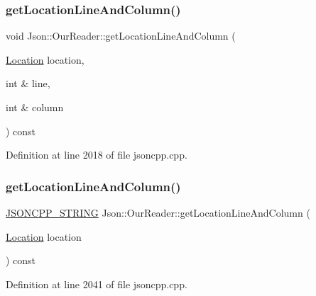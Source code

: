 \subsubsection{\texorpdfstring{get\+Location\+Line\+And\+Column()}{getLocationLineAndColumn()}\hspace{0.1cm}{\footnotesize\ttfamily [1/2]}}
{\footnotesize\ttfamily void Json\+::\+Our\+Reader\+::get\+Location\+Line\+And\+Column (\begin{DoxyParamCaption}\item[{\hyperlink{class_json_1_1_our_reader_a1bdc7bbc52ba87cae6b19746f2ee0189}{Location}}]{location,  }\item[{int \&}]{line,  }\item[{int \&}]{column }\end{DoxyParamCaption}) const\hspace{0.3cm}{\ttfamily [private]}}



Definition at line 2018 of file jsoncpp.\+cpp.

\hypertarget{class_json_1_1_our_reader_ac129e94cdc260822b2fd24e2ca35e636}{}\label{class_json_1_1_our_reader_ac129e94cdc260822b2fd24e2ca35e636} 
\subsubsection{\texorpdfstring{get\+Location\+Line\+And\+Column()}{getLocationLineAndColumn()}\hspace{0.1cm}{\footnotesize\ttfamily [2/2]}}
{\footnotesize\ttfamily \hyperlink{config_8h_a1e723f95759de062585bc4a8fd3fa4be}{J\+S\+O\+N\+C\+P\+P\+\_\+\+S\+T\+R\+I\+NG} Json\+::\+Our\+Reader\+::get\+Location\+Line\+And\+Column (\begin{DoxyParamCaption}\item[{\hyperlink{class_json_1_1_our_reader_a1bdc7bbc52ba87cae6b19746f2ee0189}{Location}}]{location }\end{DoxyParamCaption}) const\hspace{0.3cm}{\ttfamily [private]}}



Definition at line 2041 of file jsoncpp.\+cpp.

\hypertarget{class_json_1_1_our_reader_a298285d035fdbc554caae09d9f0a5859}{}\label{class_json_1_1_our_reader_a298285d035fdbc554caae09d9f0a5859} 

